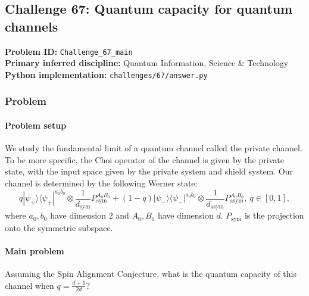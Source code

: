 \subsection[Challenge 67: Quantum capacity for quantum channels]{Challenge 67: Quantum capacity for quantum channels}
\textbf{Problem ID:} \texttt{Challenge\_67\_main}\\
\textbf{Primary inferred discipline:} Quantum Information, Science \& Technology\\
\textbf{Python implementation:} \texttt{challenges/67/answer.py}

\subsubsection*{Problem}
\paragraph*{Problem setup}
We study the fundamental limit of a quantum channel called the private channel. To be more specific, the Choi operator of the channel is given by the private state, with the input space given by the private system and shield system. Our channel is determined by the following Werner state: \[
q |\psi_+\rangle \langle \psi_+|^{a_0b_0} \otimes \frac{1}{d_{\text{sym}}} P_{\mathrm{sym}}^{A_0B_0} + (1-q) |\psi_-\rangle \langle \psi_-|^{a_0b_0} \otimes \frac{1}{d_{\mathrm{asym}}} P_{\mathrm{asym}}^{A_0B_0},\ q\in [0,1],
\]
where $a_0,b_0$ have dimension 2 and $A_0,B_0$ have dimension $d$. $P_{\mathrm{sym}}$ is the projection onto the symmetric subspace.


\paragraph*{Main problem}

Assuming the Spin Alignment Conjecture, what is the quantum capacity of this channel when $q = \frac{d+1}{2d}$?
